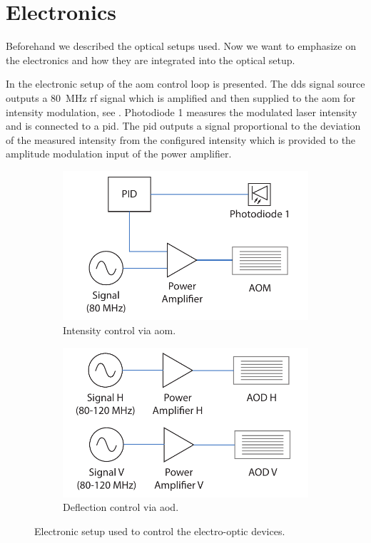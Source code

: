 \section{Electronics}

Beforehand we described the optical setups used. Now we want to emphasize
on the electronics and how they are integrated into the optical setup.

In  the electronic setup of the \gls{aom} control
loop is presented. The \gls{dds} signal source outputs a \SI{80}{\mega\hertz}
\gls{rf} signal which is amplified and then supplied to the \gls{aom} for
intensity modulation, see . Photodiode \num{1}
measures the modulated laser intensity and is connected to a \gls{pid}. The
\gls{pid} outputs a signal proportional to the deviation of the measured
intensity from the configured intensity which is provided to the amplitude
modulation input of the power amplifier.
\begin{figure}[htbp]
  \centering
  \begin{subfigure}[b]{0.4\textwidth}
    \includegraphics[width=\textwidth]{../figure/setup/aom-control.pdf}
    \caption{Intensity control via \gls{aom}.
    }\label{fig:setup_elop_aom}
  \end{subfigure}
  \begin{subfigure}[b]{0.4\textwidth}
    \includegraphics[width=\textwidth]{../figure/setup/aod-control.pdf}
    \caption{Deflection control via \gls{aod}.
    }\label{fig:setup_elop_aod}
  \end{subfigure}
  \caption{Electronic setup used to control the electro-optic devices.
  }\label{fig:setup_elop}
\end{figure}
